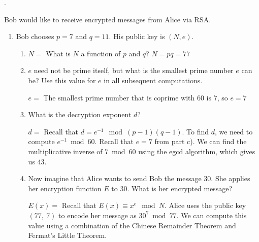\documentclass[11pt, preview]{standalone} %
\begin{document}
.

\noindent Bob would like to receive encrypted messages from Alice via RSA.
\begin{enumerate}
\item Bob chooses $p = 7$ and $q = 11$. His public key is $(N,e)$. 
\begin{enumerate}
\item \begin{Freeform}{77}
$N =$ 
\Hint What is $N$ a function of $p$ and $q$?
\Solution $N = pq = 77$
\end{Freeform}
\item $e$ need not be prime itself, but what is the smallest prime number $e$ can be? Use this value for $e$ in all subsequent computations.
\begin{Freeform}{7}
$ e = $
\Solution The smallest prime number that is coprime with $60$ is $7$, so $e = 7$
\end{Freeform}
\item What is the decryption exponent $d$?
\begin{Freeform}{43}
$d = $
\Hint Recall that $d = e^{-1} \mod (p-1)(q-1)$.
\Solution To find $d$, we need to compute $e^{-1} \bmod 60$. Recall that $e = 7$ from part c). We can find the multiplicative inverse of $7 \bmod 60$ using the egcd algorithm, which gives us $43$.  
\end{Freeform}
\item Now imagine that Alice wants to send Bob the message $30$. She applies her encryption function $E$ to $30$. What is her encrypted message?
\begin{Freeform}{2}
$E(x) = $
\Hint Recall that $E(x) \equiv x^e \mod N$.
\Solution Alice uses the public key $(77,\ 7)$ to encode her message as $30^{7} \bmod 77$. We can compute this value using a combination of the Chinese Remainder Theorem and Fermat's Little Theorem.\\


\end{Freeform}
\end{enumerate}
\end{enumerate}
\end{document}
